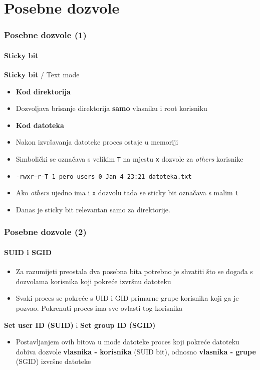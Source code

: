 \documentclass[table,usenames,dvipsnames] {beamer}
\newcommand{\shell}[1]{\texttt{#1}}
\begin{document}
\section{Posebne dozvole}
\begin{frame}[t]
  \frametitle{Posebne dozvole (1)}
  \framesubtitle{Sticky bit}
\textbf{Sticky bit} / Text mode
\begin{itemize}
  \item \textbf{Kod direktorija}
  \item[] Dozvoljava brisanje direktorija \textbf{samo} vlasniku i root korisniku
  \item \textbf{Kod datoteka}
  \item[] Nakon izvršavanja datoteke proces ostaje u memoriji
\end{itemize}
\begin{itemize}
  \item Simbolički se označava s velikim \shell{T} na mjestu \shell{x} dozvole za \textit{others} korisnike
  \item[] {\footnotesize \shell{-rwxr--r-T 1 pero users 0 Jan  4 23:21 datoteka.txt} }
  \item Ako \textit{others} ujedno ima i \shell{x} dozvolu tada se sticky bit označava s malim \shell{t}
  
  \item Danas je sticky bit relevantan samo za direktorije.
\end{itemize}
\end{frame}

\begin{frame}[t]
  \frametitle{Posebne dozvole (2)}
  \framesubtitle{SUID i SGID}
\begin{itemize}
  \item Za razumijeti preostala dva posebna bita potrebno je shvatiti što se događa s dozvolama korisnika koji pokreće izvršnu datoteku
  \item Svaki proces se pokreće s UID i GID primarne grupe korisnika koji ga je pozvao. Pokrenuti proces ima sve ovlasti tog korisnika
\end{itemize}
\vfill
\textbf{Set user ID (SUID)} i \textbf{Set group ID (SGID)}
\begin{itemize}
  \item Postavljanjem ovih bitova u mode datoteke proces koji pokreće datoteku dobiva dozvole \textbf{vlasnika - korisnika} (SUID bit), odnosno \textbf{vlasnika - grupe} (SGID) izvršne datoteke
\end{itemize}
\end{frame}
\end{document}
